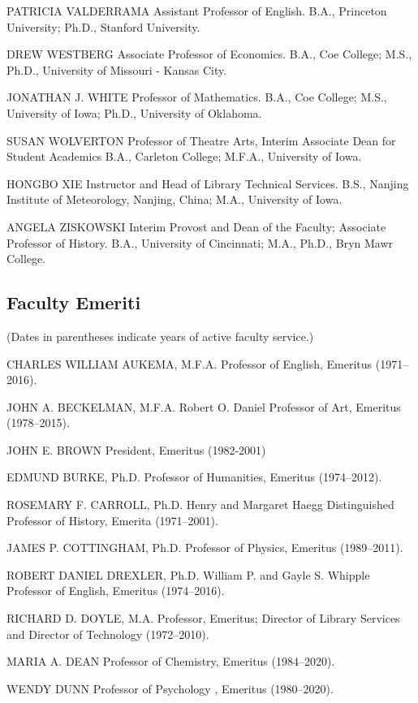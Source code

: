 \documentclass[
  letterpaper,
]{scrbook}
\begin{document}
PATRICIA VALDERRAMA Assistant Professor of English. B.A., Princeton
University; Ph.D., Stanford University.

DREW WESTBERG Associate Professor of Economics. B.A., Coe College; M.S.,
Ph.D., University of Missouri - Kansas City.

JONATHAN J. WHITE Professor of Mathematics. B.A., Coe College; M.S.,
University of Iowa; Ph.D., University of Oklahoma.

SUSAN WOLVERTON Professor of Theatre Arts, Interim Associate Dean for
Student Academics B.A., Carleton College; M.F.A., University of Iowa.

HONGBO XIE Instructor and Head of Library Technical Services. B.S.,
Nanjing Institute of Meteorology, Nanjing, China; M.A., University of
Iowa.

ANGELA ZISKOWSKI Interim Provost and Dean of the Faculty; Associate
Professor of History. B.A., University of Cincinnati; M.A., Ph.D., Bryn
Mawr College.

\hypertarget{faculty-emeriti}{%
\subsection{Faculty Emeriti}\label{faculty-emeriti}}

(Dates in parentheses indicate years of active faculty service.)

CHARLES WILLIAM AUKEMA, M.F.A. Professor of English, Emeritus
(1971--2016).

JOHN A. BECKELMAN, M.F.A. Robert O. Daniel Professor of Art, Emeritus
(1978--2015).

JOHN E. BROWN President, Emeritus (1982-2001)

EDMUND BURKE, Ph.D. Professor of Humanities, Emeritus (1974--2012).

ROSEMARY F. CARROLL, Ph.D. Henry and Margaret Haegg Distinguished
Professor of History, Emerita (1971--2001).

JAMES P. COTTINGHAM, Ph.D. Professor of Physics, Emeritus (1989--2011).

ROBERT DANIEL DREXLER, Ph.D. William P. and Gayle S. Whipple Professor
of English, Emeritus (1974--2016).

RICHARD D. DOYLE, M.A. Professor, Emeritus; Director of Library Services
and Director of Technology (1972--2010).

MARIA A. DEAN Professor of Chemistry, Emeritus (1984--2020).

WENDY DUNN Professor of Psychology , Emeritus (1980--2020).
\end{document}
